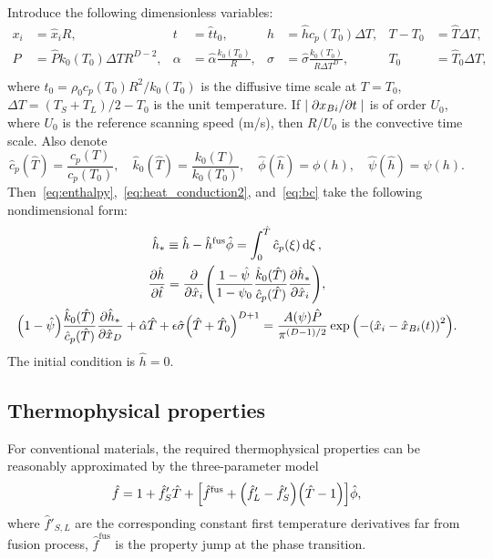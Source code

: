\documentclass{article}
\newcommand{\fusion}[1]{{#1}^\mathrm{fus}}
\begin{document}
Introduce the following dimensionless variables:
\begin{equation}\label{eq:dimensionless}
    \begin{aligned}
        x_i &= \hat{x}_iR, & t &= \hat{t}t_0, & h &= \hat{h}c_p(T_0)\Delta{T}, & T - T_0 &= \hat{T}\Delta{T}, \\
        P &= \hat{P} k_0(T_0)\Delta{T}R^{D-2}, & \alpha &= \hat{\alpha}\frac{k_0(T_0)}R, &
            \sigma &= \hat{\sigma}\frac{k_0(T_0)}{R\Delta{T}^D}, & T_0 &= \hat{T}_0\Delta{T}, \\
    \end{aligned}
\end{equation}
where \(t_0 = \rho_0 c_p(T_0) R^2/k_0(T_0)\) is the diffusive time scale at \(T=T_0\),
\(\Delta{T} = (T_S+T_L)/2 - T_0\) is the unit temperature.
If \(|\pdv*{x_{Bi}}{t}|\) is of order \(U_0\), where \(U_0\) is the reference scanning speed (\si{m/s}),
then \(R/U_0\) is the convective time scale. Also denote
\begin{equation}\label{eq:dimensionless2}
    \hat{c}_p(\hat{T}) = \frac{c_p(T)}{c_p(T_0)}, \quad
    \hat{k}_0(\hat{T}) = \frac{k_0(T)}{k_0(T_0)}, \quad
    \hat{\phi}(\hat{h}) = \phi(h), \quad
    \hat{\psi}(\hat{h}) = \psi(h).
\end{equation}
Then~\eqref{eq:enthalpy},~\eqref{eq:heat_conduction2}, and~\eqref{eq:bc} take the following nondimensional form:
\begin{gather}
	\hat{h}_* \equiv \hat{h} - \fusion{\hat{h}}\hat{\phi} = \int_0^{\hat{T}} \hat{c}_p(\xi)\dd{\xi}, \label{eq:enthalpy_hats} \\
	\pdv{\hat{h}}{\hat{t}} = \pdv{\hat{x}_i}\qty(
	    \frac{1-\hat{\psi}}{1-\psi_0}
	    \frac{\hat{k}_0(\hat{T})}{\hat{c}_p(\hat{T})}\pdv{\hat{h}_*}{\hat{x}_i}
	), \label{eq:heat_conduction_hats} \\
	\qty(1 - \hat{\psi}) \frac{\hat{k}_0(\hat{T})}{\hat{c}_p(\hat{T})}\pdv{\hat{h}_*}{\hat{x}_D} +
	    \hat{\alpha}\hat{T} + \epsilon\hat{\sigma} \qty(\hat{T} + \hat{T}_0)^{D+1} =
	    \frac{A(\psi)\hat{P}}{\pi^{(D-1)/2}}\exp\qty( -\qty(\hat{x}_i-\hat{x}_{Bi}(t))^2 ). \label{eq:bc_hats}
\end{gather}
The initial condition is \(\hat{h} = 0\).

\subsection{Thermophysical properties}

For conventional materials, the required thermophysical properties can be reasonably approximated by the three-parameter model
\begin{equation}\label{eq:thermophysical_model}
	\hat{f} = 1 + \hat{f}'_S\hat{T} + \qty[
	    \fusion{\hat{f}} + \qty(\hat{f}'_L - \hat{f}'_S) \qty(\hat{T} - 1)
	]\hat{\phi},
\end{equation}
where \(\hat{f}'_{S,L}\) are the corresponding constant first temperature derivatives far from fusion process,
\(\fusion{\hat{f}}\) is the property jump at the phase transition.
\end{document}

